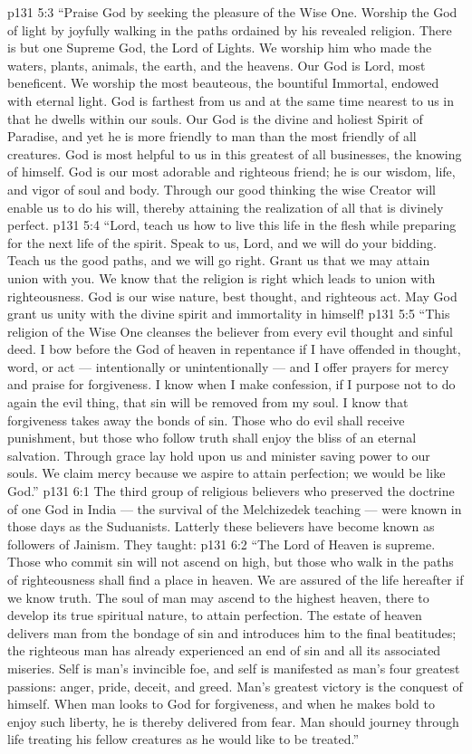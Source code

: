 \vs p131 5:3 “Praise God by seeking the pleasure of the Wise One. Worship the God of light by joyfully walking in the paths ordained by his revealed religion. There is but one Supreme God, the Lord of Lights. We worship him who made the waters, plants, animals, the earth, and the heavens. Our God is Lord, most beneficent. We worship the most beauteous, the bountiful Immortal, endowed with eternal light. God is farthest from us and at the same time nearest to us in that he dwells within our souls. Our God is the divine and holiest Spirit of Paradise, and yet he is more friendly to man than the most friendly of all creatures. God is most helpful to us in this greatest of all businesses, the knowing of himself. God is our most adorable and righteous friend; he is our wisdom, life, and vigor of soul and body. Through our good thinking the wise Creator will enable us to do his will, thereby attaining the realization of all that is divinely perfect.
\vs p131 5:4 “Lord, teach us how to live this life in the flesh while preparing for the next life of the spirit. Speak to us, Lord, and we will do your bidding. Teach us the good paths, and we will go right. Grant us that we may attain union with you. We know that the religion is right which leads to union with righteousness. God is our wise nature, best thought, and righteous act. May God grant us unity with the divine spirit and immortality in himself!
\vs p131 5:5 “This religion of the Wise One cleanses the believer from every evil thought and sinful deed. I bow before the God of heaven in repentance if I have offended in thought, word, or act --- intentionally or unintentionally --- and I offer prayers for mercy and praise for forgiveness. I know when I make confession, if I purpose not to do again the evil thing, that sin will be removed from my soul. I know that forgiveness takes away the bonds of sin. Those who do evil shall receive punishment, but those who follow truth shall enjoy the bliss of an eternal salvation. Through grace lay hold upon us and minister saving power to our souls. We claim mercy because we aspire to attain perfection; we would be like God.”
\vs p131 6:1 The third group of religious believers who preserved the doctrine of one God in India --- the survival of the Melchizedek teaching --- were known in those days as the Suduanists. Latterly these believers have become known as followers of Jainism. They taught:
\vs p131 6:2 \pc “The Lord of Heaven is supreme. Those who commit sin will not ascend on high, but those who walk in the paths of righteousness shall find a place in heaven. We are assured of the life hereafter if we know truth. The soul of man may ascend to the highest heaven, there to develop its true spiritual nature, to attain perfection. The estate of heaven delivers man from the bondage of sin and introduces him to the final beatitudes; the righteous man has already experienced an end of sin and all its associated miseries. Self is man’s invincible foe, and self is manifested as man’s four greatest passions: anger, pride, deceit, and greed. Man’s greatest victory is the conquest of himself. When man looks to God for forgiveness, and when he makes bold to enjoy such liberty, he is thereby delivered from fear. Man should journey through life treating his fellow creatures as he would like to be treated.”
